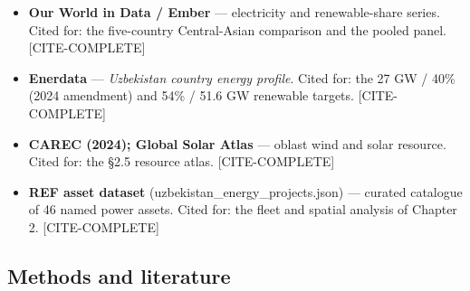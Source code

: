 \documentclass[10pt,twocolumn]{article}
\newcommand{\mkdone}[1]{{\color{metagrey}\footnotesize #1}}
\begin{document}
\begin{itemize}[leftmargin=1.2em,itemsep=1pt,topsep=2pt]
\item \textbf{Our World in Data / Ember} --- electricity and renewable-share series. Cited for: the five-country Central-Asian comparison and the pooled panel. \mkdone{[CITE-COMPLETE]}

\item \textbf{Enerdata} --- \textit{Uzbekistan country energy profile}. Cited for: the 27 GW / 40\% (2024 amendment) and 54\% / 51.6 GW renewable targets. \mkdone{[CITE-COMPLETE]}

\item \textbf{CAREC (2024); Global Solar Atlas} --- oblast wind and solar resource. Cited for: the \S{}2.5 resource atlas. \mkdone{[CITE-COMPLETE]}

\item \textbf{REF asset dataset} (uzbekistan\_energy\_projects.json) --- curated catalogue of 46 named power assets. Cited for: the fleet and spatial analysis of Chapter 2. \mkdone{[CITE-COMPLETE]}

\end{itemize}

\subsection*{Methods and literature}
\end{document}
